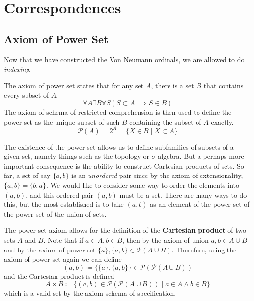 \section{Correspondences} 

\subsection{Axiom of Power Set}

  Now that we have constructed the Von Neumann ordinals, we are allowed to do \textit{indexing}. 

  \begin{axiom}
    \label{power-set-axiom}
    The axiom of power set states that for any set $A$, there is a set $B$ that contains every subset of $A$. 
    \begin{equation}
      \forall A \exists B \forall S (S \subset A \implies S \in B)
    \end{equation}
    The axiom of schema of restricted comprehension is then used to define the power set as the unique subset of such $B$ containing the subset of $A$ exactly. 
    \begin{equation}
      \mathcal{P}(A) = 2^A = \{X \in B \mid X \subset A \}
    \end{equation}
  \end{axiom} 

  The existence of the power set allows us to define subfamilies of subsets of a given set, namely things such as the topology or $\sigma$-algebra. But a perhaps more important consequence is the ability to construct Cartesian products of sets. So far, a set of say $\{a, b\}$ is an \textit{unordered} pair since by the axiom of extensionality, $\{a, b\} = \{b, a\}$. We would like to consider some way to order the elements into $(a, b)$, and this ordered pair $(a, b)$ must be a set. There are many ways to do this, but the most established is to take $(a, b)$ as an element of the power set of the power set of the union of sets. 

  \begin{definition}
    The power set axiom allows for the definition of the \textbf{Cartesian product} of two sets $A$ and $B$. Note that if $a \in A, b \in B$, then by the axiom of union $a, b \in A \cup B$ and by the axiom of power set $\{a\}, \{a, b\} \in \mathcal{P}(A \cup B)$. Therefore, using the axiom of power set again we can define
    \begin{equation}
      (a, b) \coloneqq \{\{a\}, \{a, b\}\} \in \mathcal{P}(\mathcal{P}(A \cup B))
    \end{equation} 
    and the Cartesian product is defined 
    \begin{equation}
      A \times B \coloneqq \{ (a, b) \in \mathcal{P}(\mathcal{P}(A \cup B)) \mid a \in A \land b \in B \}
    \end{equation}
    which is a valid set by the axiom schema of specification. 
  \end{definition} 

